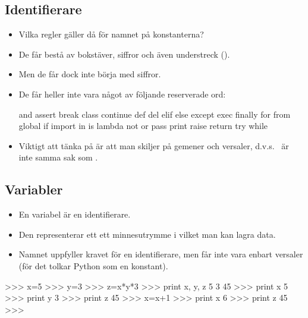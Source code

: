 \documentclass{beamer}
\begin{document}
\subsection{Identifierare}

\begin{frame}{\insertsubsectionhead}
  \begin{itemize}
    \item Vilka regler gäller då för namnet på konstanterna?
    \item De får bestå av bokstäver, siffror och även understreck (\code{_}).
    \item Men de får dock inte börja med siffror.
    \item De får heller inte vara något av följande reserverade ord:
      \begin{code}
and assert break class continue def del elif
else except exec finally for from global if
import in is lambda not or pass print raise
return try while
      \end{code}
    \item Viktigt att tänka på är att man skiljer på gemener och versaler, 
      d.v.s.\  är inte samma sak som .
  \end{itemize}
\end{frame}

\subsection{Variabler}

\begin{frame}{\insertsubsectionhead}
  \begin{itemize}
    \item En variabel är en identifierare.
    \item Den representerar ett ett minnesutrymme i vilket man kan lagra data.
    \item Namnet uppfyller kravet för en identifierare, men får inte vara 
      enbart versaler (för det tolkar Python som en konstant).
  \end{itemize}
\end{frame}

\begin{frame}[fragile]{\insertsubsectionhead}
  \begin{terminal}
>>> x=5
>>> y=3
>>> z=x*y*3
>>> print x, y, z
5 3 45
>>> print x
5
>>> print y
3
>>> print z
45
>>> x=x+1
>>> print x
6
>>> print z
45
>>>
  \end{terminal}
\end{frame}
\end{document}
